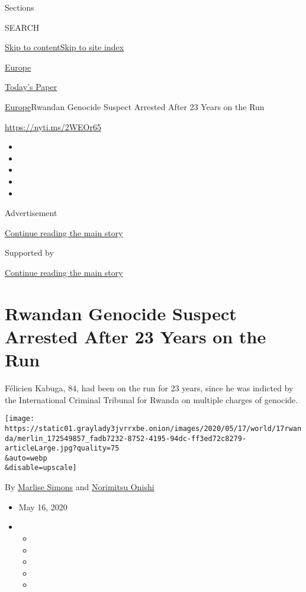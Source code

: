 Sections

SEARCH

\protect\hyperlink{site-content}{Skip to
content}\protect\hyperlink{site-index}{Skip to site index}

\href{https://www.nytimes3xbfgragh.onion/section/world/europe}{Europe}

\href{https://myaccount.nytimes3xbfgragh.onion/auth/login?response_type=cookie\&client_id=vi}{}

\href{https://www.nytimes3xbfgragh.onion/section/todayspaper}{Today's
Paper}

\href{/section/world/europe}{Europe}\textbar{}Rwandan Genocide Suspect
Arrested After 23 Years on the Run

\url{https://nyti.ms/2WEOr65}

\begin{itemize}
\item
\item
\item
\item
\item
\end{itemize}

Advertisement

\protect\hyperlink{after-top}{Continue reading the main story}

Supported by

\protect\hyperlink{after-sponsor}{Continue reading the main story}

\hypertarget{rwandan-genocide-suspect-arrested-after-23-years-on-the-run}{%
\section{Rwandan Genocide Suspect Arrested After 23 Years on the
Run}\label{rwandan-genocide-suspect-arrested-after-23-years-on-the-run}}

Félicien Kabuga, 84, had been on the run for 23 years, since he was
indicted by the International Criminal Tribunal for Rwanda on multiple
charges of genocide.

\texttt{[image: https://static01.graylady3jvrrxbe.onion/images/2020/05/17/world/17rwanda/merlin\_172549857\_fadb7232-8752-4195-94dc-ff3ed72c8279-articleLarge.jpg?quality=75\\\&auto=webp\\\&disable=upscale]}

By \href{https://www.nytimes3xbfgragh.onion/by/marlise-simons}{Marlise
Simons} and
\href{https://www.nytimes3xbfgragh.onion/by/norimitsu-onishi}{Norimitsu
Onishi}

\begin{itemize}
\item
  May 16, 2020
\item
  \begin{itemize}
  \item
  \item
  \item
  \item
  \item
  \end{itemize}
\end{itemize}

